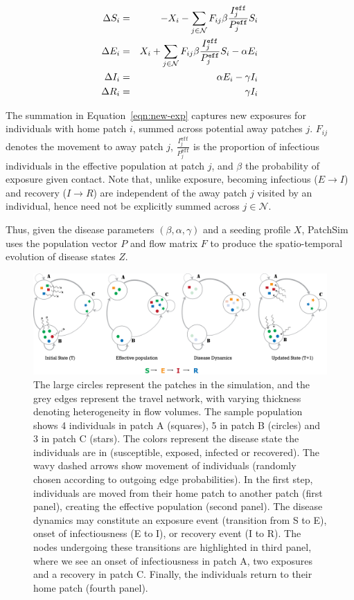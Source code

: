 \documentclass[10pt]{scrartcl}
\theoremstyle{definition}
\begin{document}
\begin{eqnarray}
	\centering 
	\Delta{S}_i &=&  - X_i - \sum_{j \in \mathcal{N}} F_{ij} \beta 
	\frac{I^{\mathtt{eff}}_j}{P^{\mathtt{eff}}_j} S_i \label{eqn:new-exp}\\
	\Delta{E}_i &=& X_i + \sum_{j \in \mathcal{N}} F_{ij} \beta 
	\frac{I^{\mathtt{eff}}_j}{P^{\mathtt{eff}}_j} S_i - \alpha E_i \\
	\Delta{I}_i &=& \alpha E_i - \gamma I_i \\
	\Delta{R}_i &=& \gamma I_i 
\end{eqnarray}

The summation in Equation~\ref{eqn:new-exp} captures new exposures for 
individuals with home patch $i$, summed across potential away patches $j$. 
$F_{ij}$ denotes the movement to away patch $j$, 
$\frac{I^{\mathtt{eff}}_j}{P^{\mathtt{eff}}_j}$ is the proportion of infectious 
individuals in the effective population at patch $j$, and $\beta$ the 
probability of exposure given contact. Note that, unlike exposure, becoming 
infectious ($E \to I$) and recovery ($I \to R$) are independent of the away 
patch $j$ visited by an individual, hence need not be explicitly summed across 
$j \in \mathcal{N}$. 

Thus, given the disease parameters $(\beta,\alpha,\gamma)$ and a seeding 
profile $X$, PatchSim uses the population vector $P$ and flow matrix $F$ to 
produce the spatio-temporal evolution of disease states $Z$.

\begin{figure}
\centering
\includegraphics[width=\textwidth]{PatchSim.png}
\caption{The large circles represent the patches in the simulation, and the 
grey edges represent the travel network, with varying thickness denoting 
heterogeneity in flow volumes. The sample population shows 4 individuals in 
patch A (squares), 5 in patch B (circles) and 3 in patch C (stars). The colors 
represent the disease state the individuals are in (susceptible, exposed, 
infected or recovered).  The wavy dashed arrows show movement of individuals 
(randomly chosen according to outgoing edge probabilities). In the first step, 
individuals are moved from their home patch to another patch (first panel), 
creating the effective population (second panel). The disease dynamics may 
constitute an exposure event (transition from S to E), onset of infectiousness 
(E to I), or recovery event (I to R).  The nodes undergoing these transitions 
are highlighted in third panel, where we see an onset of infectiousness in 
patch A, two exposures and a recovery in patch C. Finally, the individuals 
return to their home patch (fourth panel). }
\end{figure}
\end{document}
